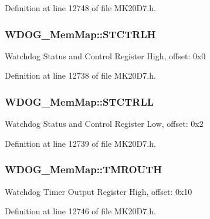 Definition at line 12748 of file M\+K20\+D7.\+h.

\subsubsection[{\texorpdfstring{S\+T\+C\+T\+R\+LH}{STCTRLH}}]{ W\+D\+O\+G\+\_\+\+Mem\+Map\+::\+S\+T\+C\+T\+R\+LH}\hypertarget{struct_w_d_o_g___mem_map_ae48286fe7c8ceabfd9aa616e40b52a35}{}\label{struct_w_d_o_g___mem_map_ae48286fe7c8ceabfd9aa616e40b52a35}
Watchdog Status and Control Register High, offset\+: 0x0 

Definition at line 12738 of file M\+K20\+D7.\+h.

\subsubsection[{\texorpdfstring{S\+T\+C\+T\+R\+LL}{STCTRLL}}]{ W\+D\+O\+G\+\_\+\+Mem\+Map\+::\+S\+T\+C\+T\+R\+LL}\hypertarget{struct_w_d_o_g___mem_map_a0eb14eade4d91bd2f2f82910d633e0aa}{}\label{struct_w_d_o_g___mem_map_a0eb14eade4d91bd2f2f82910d633e0aa}
Watchdog Status and Control Register Low, offset\+: 0x2 

Definition at line 12739 of file M\+K20\+D7.\+h.

\subsubsection[{\texorpdfstring{T\+M\+R\+O\+U\+TH}{TMROUTH}}]{ W\+D\+O\+G\+\_\+\+Mem\+Map\+::\+T\+M\+R\+O\+U\+TH}\hypertarget{struct_w_d_o_g___mem_map_a47bce5f5c4ea1609ec9d0055e05e9b73}{}\label{struct_w_d_o_g___mem_map_a47bce5f5c4ea1609ec9d0055e05e9b73}
Watchdog Timer Output Register High, offset\+: 0x10 

Definition at line 12746 of file M\+K20\+D7.\+h.

